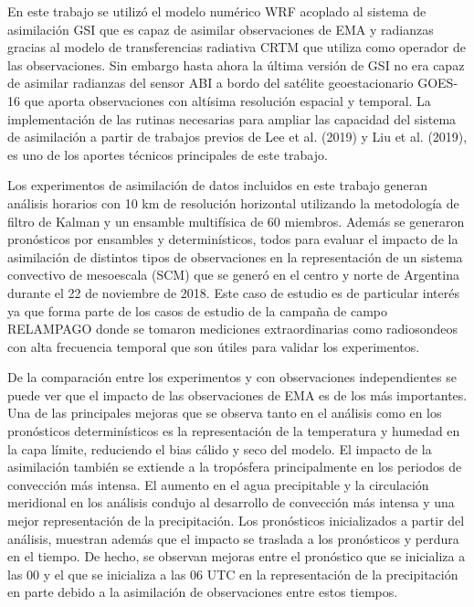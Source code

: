 \documentclass[12pt,oneside,a4paper]{reedthesis}
\begin{document}
En este trabajo se utilizó el modelo numérico WRF acoplado al sistema de asimilación GSI que es capaz de asimilar observaciones de EMA y radianzas gracias al modelo de transferencias radiativa CRTM que utiliza como operador de las observaciones. Sin embargo hasta ahora la última versión de GSI no era capaz de asimilar radianzas del sensor ABI a bordo del satélite geoestacionario GOES-16 que aporta observaciones con altísima resolución espacial y temporal. La implementación de las rutinas necesarias para ampliar las capacidad del sistema de asimilación a partir de trabajos previos de Lee et al. (2019) y Liu et al. (2019), es uno de los aportes técnicos principales de este trabajo.

Los experimentos de asimilación de datos incluidos en este trabajo generan análisis horarios con 10 km de resolución horizontal utilizando la metodología de filtro de Kalman y un ensamble multifísica de 60 miembros. Además se generaron pronósticos por ensambles y determinísticos, todos para evaluar el impacto de la asimilación de distintos tipos de observaciones en la representación de un sistema convectivo de mesoescala (SCM) que se generó en el centro y norte de Argentina durante el 22 de noviembre de 2018. Este caso de estudio es de particular interés ya que forma parte de los casos de estudio de la campaña de campo RELAMPAGO donde se tomaron mediciones extraordinarias como radiosondeos con alta frecuencia temporal que son útiles para validar los experimentos.

De la comparación entre los experimentos y con observaciones independientes se puede ver que el impacto de las observaciones de EMA es de los más importantes. Una de las principales mejoras que se observa tanto en el análisis como en los pronósticos determinísticos es la representación de la temperatura y humedad en la capa límite, reduciendo el bias cálido y seco del modelo. El impacto de la asimilación también se extiende a la tropósfera principalmente en los periodos de convección más intensa. El aumento en el agua precipitable y la circulación meridional en los análisis condujo al desarrollo de convección más intensa y una mejor representación de la precipitación. Los pronósticos inicializados a partir del análisis, muestran además que el impacto se traslada a los pronósticos y perdura en el tiempo. De hecho, se observan mejoras entre el pronóstico que se inicializa a las 00 y el que se inicializa a las 06 UTC en la representación de la precipitación en parte debido a la asimilación de observaciones entre estos tiempos.
\end{document}
